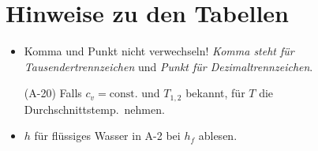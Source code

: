 
\section*{Hinweise zu den Tabellen} %
	\begin{itemize}
		\item Komma und Punkt nicht verwechseln! \emph{Komma steht für Tausendertrennzeichen} und \emph{Punkt für Dezimaltrennzeichen}.
		\item[(A-20)] Falls $c_v = \text{const}.$ und $T_{1,2}$ bekannt, für $T$ die Durchschnittstemp.~nehmen.
		\item $h$ für flüssiges Wasser in A-2 bei $h_f$ ablesen.
	\end{itemize}
